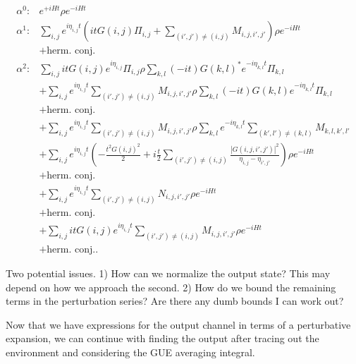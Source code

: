 \documentclass{article}
\newcommand{\parens}[1]{\left( #1 \right)}
\newcommand{\abs}[1]{\left| #1 \right|}
\begin{document}
\begin{align}
\alpha^0 :& e^{+i H t} \rho e^{-i H t} \\
 \alpha^1 :& \sum_{i,j} e^{i\eta_{i,j}t} \parens{i t G(i,j) \Pi_{i,j} + \sum_{(i',j') \neq (i,j)} M_{i,j,i',j'}} \rho e^{- i H t} \\
 &+ \text{herm. conj.} \\
 \alpha^2 :& \sum_{i,j} i t G(i,j) e^{i \eta_{i,j}} \Pi_{i,j} \rho \sum_{k,l} (-i t) G(k,l)^* e^{-i \eta_{k,l}t} \Pi_{k,l} \\
 &+ \sum_{i,j} e^{i \eta_{i,j} t} \sum_{(i',j') \neq (i,j)} M_{i,j,i',j'} \rho \sum_{k,l} (-i t) G(k,l) e^{-i \eta_{k,l} t} \Pi_{k,l} \\
 &+ \text{herm. conj.} \\
 &+ \sum_{i,j} e^{i \eta_{i,j} t} \sum_{(i',j') \neq (i,j)} M_{i,j,i',j'} \rho \sum_{k,l} e^{-i \eta_{k,l} t} \sum_{(k',l') \neq (k,l)} M_{k,l,k',l'}\\
 &+  \sum_{i,j} e^{i \eta_{i,j} t} \parens{- \frac{t^2 G(i,j)^2}{2} + i \frac{t}{2} \sum_{(i',j') \neq (i,j)} \frac{\abs{G(i,j,i',j')}^2}{\eta_{i,j} - \eta_{i',j'}} } \rho e^{- i H t} \\
 &+ \text{herm. conj.} \\
 &+ \sum_{i,j} e^{i \eta_{i,j} t} \sum_{(i',j') \neq (i,j)} N_{i,j,i',j'} \rho e^{-i H t} \\
 &+ \text{herm. conj.} \\
 &+ \sum_{i,j} i t G(i,j) e^{i \eta_{i,j} t} \sum_{(i',j') \neq (i,j)} M_{i,j,i',j'} \rho e^{-i H t} \\
 &+ \text{herm. conj.}.
\end{align}

Two potential issues. 1) How can we normalize the output state? This may depend on how we approach the second. 2) How do we bound the remaining terms in the perturbation series? Are there any dumb bounds I can work out? 

Now that we have expressions for the output channel in terms of a perturbative expansion, we can continue with finding the output after tracing out the environment and considering the GUE averaging integral. 

\end{document}
